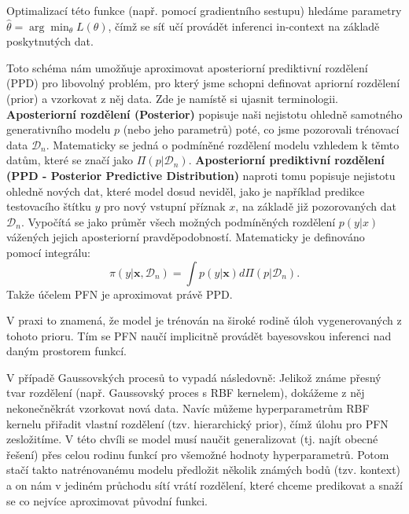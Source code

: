 Optimalizací této funkce (např. pomocí gradientního sestupu) hledáme parametry $\hat{\theta} = \arg\min_{\theta} L(\theta)$, čímž se síť učí provádět inferenci in-context na základě poskytnutých dat.
\par   

Toto schéma nám umožňuje aproximovat aposteriorní prediktivní rozdělení (PPD) pro libovolný problém, pro který jsme schopni definovat apriorní rozdělení (prior) a vzorkovat z něj data.
Zde je namístě si ujasnit terminologii.
\textbf{Aposteriorní rozdělení (Posterior)} popisuje naši nejistotu ohledně samotného generativního modelu $p$ (nebo jeho parametrů) poté, co jsme pozorovali trénovací data $\mathcal{D}_n$. 
Matematicky se jedná o podmíněné rozdělení modelu vzhledem k těmto datům, které se značí jako $\Pi(p|\mathcal{D}_n)$.
\textbf{Aposteriorní prediktivní rozdělení (PPD - Posterior Predictive Distribution)} naproti tomu popisuje nejistotu ohledně nových dat, které model dosud neviděl, jako je například predikce testovacího štítku $y$ pro nový vstupní příznak $x$, na základě již pozorovaných dat $\mathcal{D}_n$. 
Vypočítá se jako průměr všech možných podmíněných rozdělení $p(y|x)$ vážených jejich aposteriorní pravděpodobností. 
Matematicky je definováno pomocí integrálu:
$$ \pi(y|\mathbf{x},\mathcal{D}_n) = \int p(y|\mathbf{x})d\Pi(p|\mathcal{D}_n). $$
Takže účelem PFN je aproximovat právě PPD.

V praxi to znamená, že model je trénován na široké rodině úloh vygenerovaných z tohoto prioru. 
Tím se PFN naučí implicitně provádět bayesovskou inferenci nad daným prostorem funkcí.

V případě Gaussovských procesů to vypadá následovně: Jelikož známe přesný tvar rozdělení (např. Gaussovský proces s RBF kernelem), dokážeme z něj nekonečněkrát vzorkovat nová data. 
Navíc můžeme hyperparametrům RBF kernelu přiřadit vlastní rozdělení (tzv. hierarchický prior), čímž úlohu pro PFN zesložitíme.
V této chvíli se model musí naučit generalizovat (tj. najít obecné řešení) přes celou rodinu funkcí pro všemožné hodnoty hyperparametrů. 
Potom stačí takto natrénovanému modelu předložit několik známých bodů (tzv. kontext) a on nám v jediném průchodu sítí vrátí rozdělení, které chceme predikovat a snaží se co nejvíce aproximovat původní funkci.
\par

